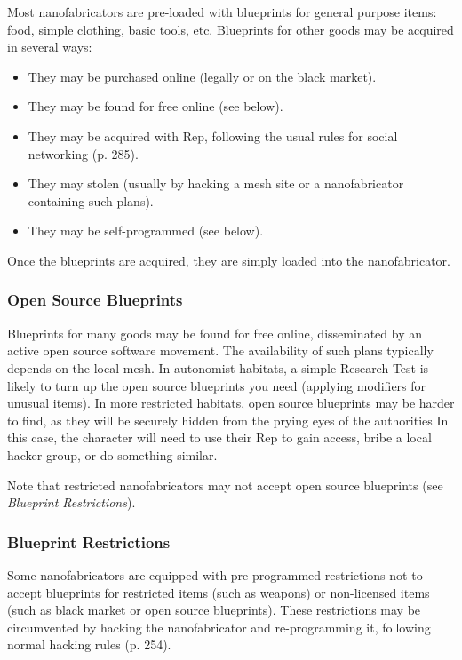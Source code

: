 Most nanofabricators are pre-loaded with blueprints 
for general purpose items: food, simple clothing, basic 
tools, etc. Blueprints for other goods may be acquired 
in several ways:

\begin{itemize}
\item They may be purchased online (legally or on the black market).
\item They may be found for free online (see below).
\item They may be acquired with Rep, following the usual rules for social networking (p. 285).
\item They may stolen (usually by hacking a mesh site or a nanofabricator containing such plans).
\item They may be self-programmed (see below).
\end{itemize}

\noindent Once the blueprints are acquired, they are simply 
loaded into the nanofabricator.

\subsubsection{Open Source Blueprints}

Blueprints for many goods may be found for free 
online, disseminated by an active open source 
software movement. The availability of such plans 
typically depends on the local mesh. In autonomist 
habitats, a simple Research Test is likely to turn up the 
open source blueprints you need (applying modifiers 
for unusual items). In more restricted habitats, open 
source blueprints may be harder to find, as they will 
be securely hidden from the prying eyes of the authorities
In this case, the character will need to use their
Rep to gain access, bribe a local hacker group, or do 
something similar.

Note that restricted nanofabricators may not accept 
open source blueprints (see \textit{Blueprint Restrictions}).

\subsubsection{Blueprint Restrictions}

Some nanofabricators are equipped with pre-programmed
restrictions not to accept blueprints for restricted
items (such as weapons) or non-licensed items
(such as black market or open source blueprints). 
These restrictions may be circumvented by hacking 
the nanofabricator and re-programming it, following 
normal hacking rules (p. 254).

